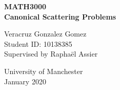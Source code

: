\begin{titlepage}
   \begin{center}
       \vspace*{1cm}

       \textbf{MATH3000} \\
       \textbf{Canonical Scattering Problems}\\

       \vspace{1.5cm}

       Veracruz Gonzalez Gomez \\
       Student ID: 10138385 \\
       Supervised by Raphaël Assier \\

       \vfill

        University of Manchester\\
        January 2020 \\

   \end{center}
\end{titlepage}
